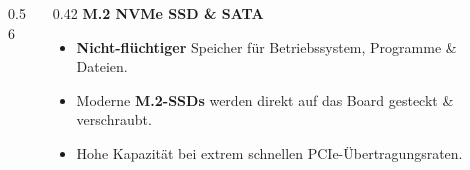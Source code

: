 \begin{frame}
\end{frame}

{
\begin{frame}
\end{frame}}

\begin{frame}
\begin{columns}[c,onlytextwidth]
    \begin{column}{0.56\textwidth}
        \centering
    \end{column}
    \begin{column}{0.42\textwidth}
        \large\bfseries\color{Orchid!90!black}M.2 NVMe SSD \& SATA\par\vspace{3mm}
        \normalsize\normalfont
        \begin{itemize}\setlength\itemsep{6pt}
            \item \textbf{Nicht-flüchtiger} Speicher für Betriebssystem, Programme \& Dateien.
            \item Moderne \textbf{M.2-SSDs} werden direkt auf das Board gesteckt \& verschraubt.
            \item Hohe Kapazität bei extrem schnellen PCIe-Übertragungsraten.
        \end{itemize}
    \end{column}
\end{columns}
\end{frame}

